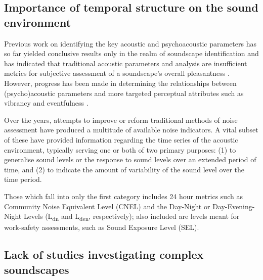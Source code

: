 \subsection{Importance of temporal structure on the sound environment}

Previous work on identifying the key acoustic and psychoacoustic parameters has so far yielded conclusive results only in the realm of soundscape identification \cite{Rychtarikova2013Soundscape} and has indicated that traditional acoustic parameters and analysis are insufficient metrics for subjective assessment of a soundscape's overall pleasantness \cite{Aletta2014Towards}. However, progress has been made in determining the relationships between (psycho)acoustic parameters and more targeted perceptual attributes such as vibrancy and eventfulness \cite{Aletta2018Towards, Jeon2011Non}.


Over the years, attempts to improve or reform traditional methods of noise assessment have produced a multitude of available noise indicators. A vital subset of these have provided information regarding the time series of the acoustic environment, typically serving one or both of two primary purposes: (1) to generalise sound levels or the response to sound levels over an extended period of time, and (2) to indicate the amount of variability of the sound level over the time period.

Those which fall into only the first category includes 24 hour metrics such as Community Noise Equivalent Level (CNEL) and the Day-Night  or Day-Evening-Night Levels (L\textsubscript{dn}
and L\textsubscript{den}, respectively); also included are levels meant for work-safety assessments, such as Sound Exposure Level (SEL).


\subsection{Lack of studies investigating complex soundscapes}

